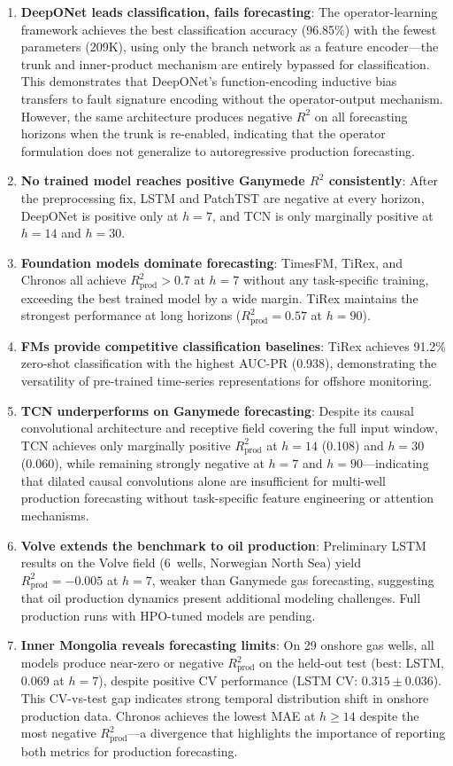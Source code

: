 \documentclass[conference]{IEEEtran}
\begin{document}
\begin{enumerate}
    \item \textbf{DeepONet leads classification, fails forecasting}: The operator-learning framework achieves the best classification accuracy (96.85\%) with the fewest parameters (209K), using only the branch network as a feature encoder---the trunk and inner-product mechanism are entirely bypassed for classification. This demonstrates that DeepONet's function-encoding inductive bias transfers to fault signature encoding without the operator-output mechanism. However, the same architecture produces negative $R^2$ on all forecasting horizons when the trunk is re-enabled, indicating that the operator formulation does not generalize to autoregressive production forecasting.
    \item \textbf{No trained model reaches positive Ganymede $R^2$ consistently}: After the preprocessing fix, LSTM and PatchTST are negative at every horizon, DeepONet is positive only at $h{=}7$, and TCN is only marginally positive at $h{=}14$ and $h{=}30$.
    \item \textbf{Foundation models dominate forecasting}: TimesFM, TiRex, and Chronos all achieve $R^2_\text{prod} > 0.7$ at $h{=}7$ without any task-specific training, exceeding the best trained model by a wide margin. TiRex maintains the strongest performance at long horizons ($R^2_\text{prod}{=}0.57$ at $h{=}90$).
    \item \textbf{FMs provide competitive classification baselines}: TiRex achieves 91.2\% zero-shot classification with the highest AUC-PR (0.938), demonstrating the versatility of pre-trained time-series representations for offshore monitoring.
    \item \textbf{TCN underperforms on Ganymede forecasting}: Despite its causal convolutional architecture and receptive field covering the full input window, TCN achieves only marginally positive $R^2_\text{prod}$ at $h{=}14$ (0.108) and $h{=}30$ (0.060), while remaining strongly negative at $h{=}7$ and $h{=}90$---indicating that dilated causal convolutions alone are insufficient for multi-well production forecasting without task-specific feature engineering or attention mechanisms.
    \item \textbf{Volve extends the benchmark to oil production}: Preliminary LSTM results on the Volve field (6~wells, Norwegian North Sea) yield $R^2_\text{prod}{=}-0.005$ at $h{=}7$, weaker than Ganymede gas forecasting, suggesting that oil production dynamics present additional modeling challenges. Full production runs with HPO-tuned models are pending.
    \item \textbf{Inner Mongolia reveals forecasting limits}: On 29 onshore gas wells, all models produce near-zero or negative $R^2_\text{prod}$ on the held-out test (best: LSTM, 0.069 at $h{=}7$), despite positive CV performance (LSTM CV: $0.315 \pm 0.036$). This CV-vs-test gap indicates strong temporal distribution shift in onshore production data. Chronos achieves the lowest MAE at $h \geq 14$ despite the most negative $R^2_\text{prod}$---a divergence that highlights the importance of reporting both metrics for production forecasting.
\end{enumerate}
\end{document}
